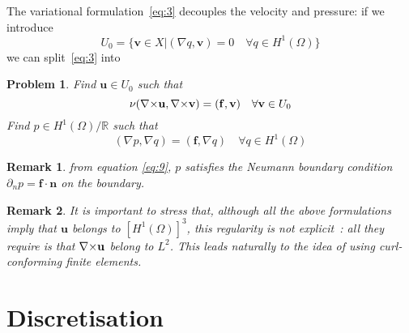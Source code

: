 \documentclass{article}
\newtheorem{problem}{Problem}
\newtheorem{remark}{Remark}
\newcommand{\Hp}[1][1]{\ensuremath{H^{#1}(\Omega)}\xspace}
\begin{document}
The variational formulation~\eqref{eq:3} decouples the velocity and pressure: if
we introduce
\begin{equation}
  \label{eq:7}
  U_0 = \{ \mathbf{v} \in X | (\nabla q, \mathbf{v}) = 0\quad \forall q \in \Hp\}
\end{equation}
we can split~\eqref{eq:3} into
\begin{problem}
  \label{prob:2}
  Find $\mathbf{u} \in U_0 $ such that
  \begin{equation}
    \label{eq:8}
    \nu ({\nabla\times} \mathbf{u}, {\nabla\times} \mathbf{v} )  = (\mathbf{f}, \mathbf{v}) \quad
    \forall \mathbf{v} \in U_0
  \end{equation}
  Find $p \in \Hp/\mathbb{R}$ such that
  \begin{equation}
    \label{eq:9}
    (\nabla p, \nabla q) = (\mathbf{f}, \nabla q)\quad \forall q \in \Hp
  \end{equation}
\end{problem}
\begin{remark}
  \label{rem:3}
  from equation \eqref{eq:9}, $p$ satisfies the Neumann boundary condition
  $\partial_n p = \mathbf{f} \cdot \mathbf{n}$ on the boundary.
\end{remark}
\begin{remark}
  \label{rem:4}
  It is important to stress that, although all the above formulations imply that
  $\mathbf{u}$ belongs to $[\Hp]^3$, this regularity is not explicit~: all they
  require is that ${\nabla\times}\mathbf{u}$ belong to $L^2$. This leads naturally to
  the idea of using curl-conforming finite elements.
\end{remark}

\section{Discretisation}
\label{sec:discretisation}
\end{document}
